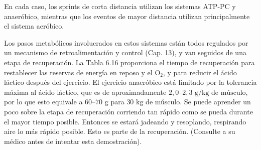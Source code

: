 \documentclass[12pt]{book}
\begin{document}
En cada caso, los sprints de corta distancia utilizan los sistemas ATP-PC y anaeróbico, mientras que los eventos de mayor distancia utilizan principalmente el sistema aeróbico.

Los pasos metabólicos involucrados en estos sistemas están todos regulados por un mecanismo de retroalimentación y control (Cap. 13), y van seguidos de una etapa de recuperación. La Tabla 6.16 proporciona el tiempo de recuperación para restablecer las reservas de energía en reposo y el $\text{O}_2$, y para reducir el ácido láctico después del ejercicio. El ejercicio anaeróbico está limitado por la tolerancia máxima al ácido láctico, que es de aproximadamente $2,0\text{--}2,3\text{ g/kg de músculo}$, por lo que esto equivale a $60\text{--}70\text{ g}$ para $30\text{ kg}$ de músculo. Se puede aprender un poco sobre la etapa de recuperación corriendo tan rápido como se pueda durante el mayor tiempo posible. Entonces se estará jadeando y resoplando, respirando aire lo más rápido posible. Esto es parte de la recuperación. (Consulte a su médico antes de intentar esta demostración).
\end{document}
